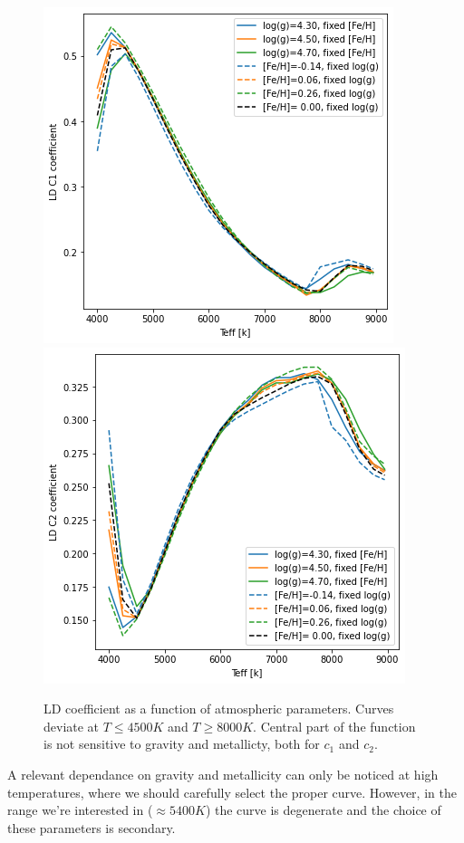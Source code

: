 \documentclass{aa}
\begin{document}
\begin{figure}[h]
    \centering  
    \includegraphics[scale=0.4, angle=0]{pictures/2017_c1}
    \includegraphics[scale=0.4, angle=0]{pictures/2017_c2}
    \caption{LD coefficient as a function of atmospheric parameters. Curves deviate at $T\leq 4500K$ and $T\geq 8000K$. Central part of the function is not sensitive to gravity and metallicty, both for $c_1$ and $c_2$.}
\end{figure}
A relevant dependance on gravity and metallicity can only be noticed at 
high temperatures, where we should carefully select the proper curve. However,
in the range we're interested in ($\approx 5400 K$) the curve is 
degenerate and the choice of these parameters is secondary.
\end{document}
